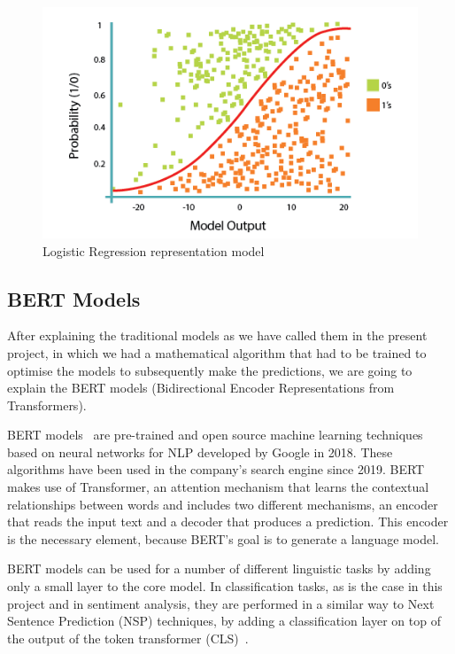 \begin{figure}[!htp]
    \centering
    \includegraphics[scale=0.6]{img/detection/LogisticRegression.png}
    \caption{Logistic Regression representation model}
    \label{fig:LogisticRegression}
\end{figure}



\subsection{BERT Models}

After explaining the traditional models as we have called them in the present project, in which we had a mathematical algorithm that had to be trained to optimise the models to subsequently make the predictions, we are going to explain the BERT models (Bidirectional Encoder Representations from Transformers). 

BERT models~\cite{acheampong2021transformer} are pre-trained and open source machine learning techniques based on neural networks for NLP developed by Google in 2018. These algorithms have been used in the company's search engine since 2019. BERT makes use of Transformer, an attention mechanism that learns the contextual relationships between words and includes two different mechanisms, an encoder that reads the input text and a decoder that produces a prediction. This encoder is the necessary element, because BERT's goal is to generate a language model.

BERT models can be used for a number of different linguistic tasks by adding only a small layer to the core model. In classification tasks, as is the case in this project and in sentiment analysis, they are performed in a similar way to Next Sentence Prediction (NSP) techniques, by adding a classification layer on top of the output of the token transformer (CLS)~\cite{BERTExpl89:online}.

